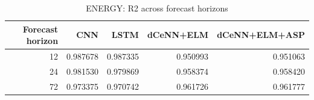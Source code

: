 \begin{table}
\caption{ENERGY: R2 across forecast horizons}
\begin{tabular}{rrrrr}
\toprule
Forecast horizon & CNN & LSTM & dCeNN+ELM & dCeNN+ELM+ASP \\
\midrule
12 & 0.987678 & 0.987335 & 0.950993 & 0.951063 \\
24 & 0.981530 & 0.979869 & 0.958374 & 0.958420 \\
72 & 0.973375 & 0.970742 & 0.961726 & 0.961777 \\
\bottomrule
\end{tabular}
\end{table}
